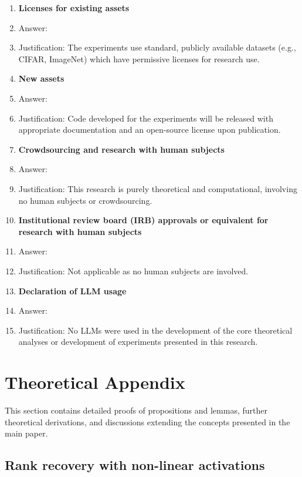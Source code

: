 \documentclass{article}
\numberwithin{figure}{section}
\begin{document}
\begin{enumerate}
\item {\bf Licenses for existing assets}
    \item Answer: \answerNA{} %
    \item Justification: The  experiments use standard, publicly available datasets (e.g., CIFAR, ImageNet) which have permissive licenses for research use.

\item {\bf New assets}
    \item Answer: \answerNA{} %
    \item Justification: Code developed for the experiments will be released with appropriate documentation and an open-source license upon publication.

\item {\bf Crowdsourcing and research with human subjects}
    \item Answer: \answerNA{}
    \item Justification: This research is purely theoretical and computational, involving no human subjects or crowdsourcing.

\item {\bf Institutional review board (IRB) approvals or equivalent for research with human subjects}
    \item Answer: \answerNA{}
    \item Justification: Not applicable as no human subjects are involved.

\item {\bf Declaration of LLM usage}
    \item Answer: \answerNo{}
    \item Justification: No LLMs were used in the development of the core theoretical analyses or development of experiments presented in this research. 
\end{enumerate}

\renewcommand{\thefigure}{\thesection.\arabic{figure}}


\appendix
\newpage
\section{Theoretical Appendix}
\label{app:theory_appendix}
This section contains detailed proofs of propositions and lemmas, further theoretical derivations, and discussions extending the concepts presented in the main paper. 

\subsection{Rank recovery with non-linear activations}
\end{document}
